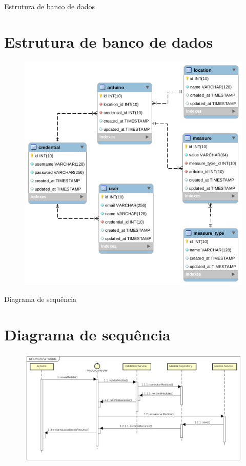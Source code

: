 \documentclass[aspectratio=43]{beamer}
\begin{document}
\begin{frame}{Estrutura de banco de dados}
\section{Estrutura de banco de dados}
    \begin{figure}[H]
        \label{figure_diagrama_banco}
        \includegraphics[scale=0.33]{scheme.png}
        \centering
        \hfill
    \end{figure}
\end{frame}

\begin{frame}{Diagrama de sequência}
\section{Diagrama de sequência}
    \begin{figure}[H]
        \label{figure_diagrama_sequencia}
        \includegraphics[scale=0.33]{sequencia.png}
        \centering
        \hfill
    \end{figure}
\end{frame}
\end{document}
